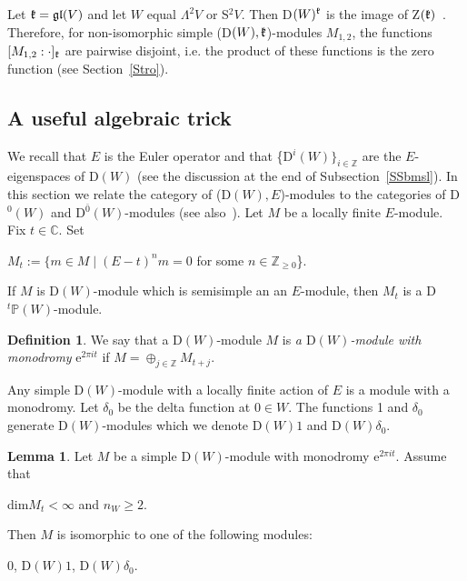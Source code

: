 \documentclass[12pt]{amsart}
\theoremstyle{definition}\newtheorem{theorem}{Theorem}[section]
\newtheorem{lemma}[proposition]{Lemma}
\theoremstyle{definition}\newtheorem{definition}[proposition]{Definition}
\theoremstyle{remark}\newtheorem{example}[proposition]{Example}
\begin{document}
Let $\frak k=\frak{gl}(V)$ and let $W$ equal $\Lambda^2V$ or S$^2V$. Then D$(W)^\frak k$ is the image of Z$(\frak k)$~\cite{HU}. Therefore, for non-isomorphic simple (D$(W), \frak k$)-modules $M_{1,2}$, the functions $[M_{1,2}:\cdot]_\frak k$ are pairwise disjoint, i.e. the product of these functions is the zero function (see Section~\ref{Stro}).
\subsection{A useful algebraic trick}\label{SSutr} We recall that $E$ is the Euler operator and that \{D$^i(W)\}_{i\in\mathbb Z}$ are the $E$-eigenspaces of D$(W)$ (see the discussion at the end of Subsection~\ref{SSbmsl}). In this section we relate the category of (D$(W), E$)-modules to the categories of D$^0(W)$ and D$^{\bar 0}(W)$-modules (see also~\cite{PS2}). Let $M$ be a locally finite $E$-module. Fix $t\in\mathbb C$. Set\begin{center}$M_t:=\{m\in M\mid (E-t)^nm=0$ for some $n\in\mathbb Z_{\ge0}$\}.\end{center}
If $M$ is D$(W)$-module which is semisimple an an $E$-module, then $M_t$ is a D$^t\mathbb P(W)$-module.
\begin{definition}We say that a D$(W)$-module $M$ is {\it a $\mathrm  D(W)$-module with monodromy} e$^{2\pi it}$ if $M=\oplus_{j\in\mathbb Z}M_{t+j}$.\end{definition}
Any simple D$(W)$-module with a locally finite action of $E$ is a module with a monodromy. Let $\delta_0$ be the delta function at $0\in W$. The functions 1 and $\delta_0$ generate D$(W)$-modules which we denote D$(W)1$ and D$(W)\delta_0$.
\begin{lemma}\label{Lsup} Let $M$ be a simple D$(W)$-module with monodromy e$^{2\pi it}$. Assume that \begin{center}dim$M_t<\infty$ and $n_W\ge 2$.\end{center} Then $M$ is isomorphic to one of the following modules: \begin{center}0, D$(W)1$, D$(W)\delta_0$.\end{center}\end{lemma}
\end{document}
